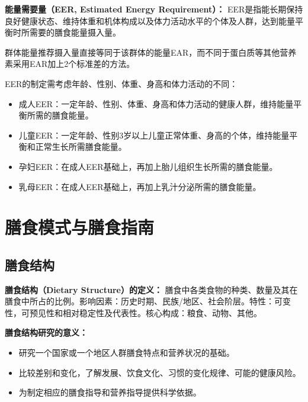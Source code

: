 \begin{defbox}
\textbf{能量需要量（EER, Estimated Energy Requirement）：}
EER是指能长期保持良好健康状态、维持体重和机体构成以及体力活动水平的个体及人群，达到能量平衡时所需要的膳食能量摄入量。

群体能量推荐摄入量直接等同于该群体的能量EAR，而不同于蛋白质等其他营养素采用EAR加上2个标准差的方法。

EER的制定需考虑年龄、性别、体重、身高和体力活动的不同：
\begin{itemize}[leftmargin=*]
    \item 成人EER：一定年龄、性别、体重、身高和体力活动的健康人群，维持能量平衡所需的膳食能量。
    \item 儿童EER：一定年龄、性别3岁以上儿童正常体重、身高的个体，维持能量平衡和正常生长所需膳食能量。
    \item 孕妇EER：在成人EER基础上，再加上胎儿组织生长所需的膳食能量。
    \item 乳母EER：在成人EER基础上，再加上乳汁分泌所需的膳食能量。
\end{itemize}
\end{defbox}

\section{膳食模式与膳食指南}

\subsection{膳食结构}

\begin{defbox}
\textbf{膳食结构（Dietary Structure）的定义：}
膳食中各类食物的种类、数量及其在膳食中所占的比例。影响因素：历史时期、民族/地区、社会阶层。特性：可变性，可预见性和相对稳定性及代表性。核心构成：粮食、动物、其他。

\textbf{膳食结构研究的意义：}
\begin{itemize}[leftmargin=*]
    \item 研究一个国家或一个地区人群膳食特点和营养状况的基础。
    \item 比较差别和变化，了解发展、饮食文化、习惯的变化规律、可能的健康风险。
    \item 为制定相应的膳食指导和营养指导提供科学依据。
\end{itemize}
\end{defbox}

